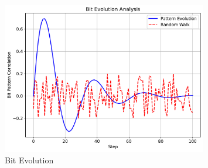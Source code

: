 \begin{figure}[ht]
\centering
\includegraphics[width=0.8\textwidth]{figures/bit_evolution.pdf}
\caption{Bit Evolution}
\label{fig:bit_evolution_conclusion}
\end{figure} 